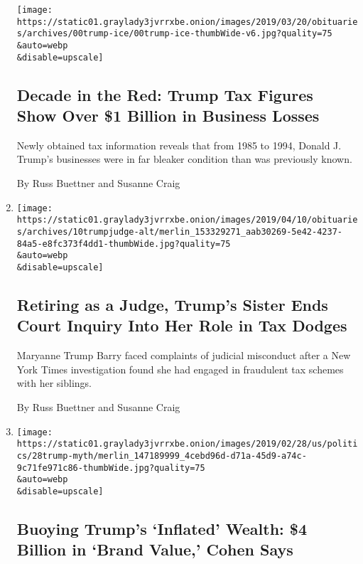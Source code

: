 \begin{enumerate}
  \texttt{[image: https://static01.graylady3jvrrxbe.onion/images/2019/03/20/obituaries/archives/00trump-ice/00trump-ice-thumbWide-v6.jpg?quality=75\\\&auto=webp\\\&disable=upscale]}

  \hypertarget{decade-in-the-red-trump-tax-figures-show-over-1-billion-in-business-losses}{%
  \subsection{Decade in the Red: Trump Tax Figures Show Over \$1 Billion
  in Business
  Losses}\label{decade-in-the-red-trump-tax-figures-show-over-1-billion-in-business-losses}}

  Newly obtained tax information reveals that from 1985 to 1994, Donald
  J. Trump's businesses were in far bleaker condition than was
  previously known.

  By Russ Buettner and Susanne Craig
\item
  \href{/2019/04/10/us/maryanne-trump-barry-misconduct-inquiry.html}{}

  \texttt{[image: https://static01.graylady3jvrrxbe.onion/images/2019/04/10/obituaries/archives/10trumpjudge-alt/merlin\_153329271\_aab30269-5e42-4237-84a5-e8fc373f4dd1-thumbWide.jpg?quality=75\\\&auto=webp\\\&disable=upscale]}

  \hypertarget{retiring-as-a-judge-trumps-sister-ends-court-inquiry-into-her-role-in-tax-dodges}{%
  \subsection{Retiring as a Judge, Trump's Sister Ends Court Inquiry
  Into Her Role in Tax
  Dodges}\label{retiring-as-a-judge-trumps-sister-ends-court-inquiry-into-her-role-in-tax-dodges}}

  Maryanne Trump Barry faced complaints of judicial misconduct after a
  New York Times investigation found she had engaged in fraudulent tax
  schemes with her siblings.

  By Russ Buettner and Susanne Craig
\item
  \href{/2019/02/27/us/politics/donald-trump-wealth.html}{}

  \texttt{[image: https://static01.graylady3jvrrxbe.onion/images/2019/02/28/us/politics/28trump-myth/merlin\_147189999\_4cebd96d-d71a-45d9-a74c-9c71fe971c86-thumbWide.jpg?quality=75\\\&auto=webp\\\&disable=upscale]}

  \hypertarget{buoying-trumps-inflated-wealth-4-billion-in-brand-value-cohen-says}{%
  \subsection{Buoying Trump's `Inflated' Wealth: \$4 Billion in `Brand
  Value,' Cohen
  Says}\label{buoying-trumps-inflated-wealth-4-billion-in-brand-value-cohen-says}}


\end{enumerate}

